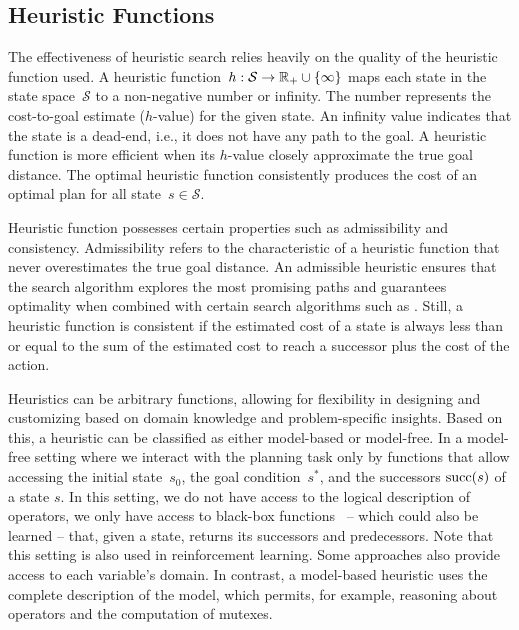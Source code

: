\subsection{Heuristic Functions}
\label{sec:background_heuristicfunctions}

The effectiveness of heuristic search relies heavily on the quality of the heuristic function used. A heuristic function~$h:\mathcal{S}\rightarrow\mathbb{R}_{+}\cup\{\infty\}$ maps each state in the state space~$\mathcal{S}$ to a non-negative number or infinity. The number represents the cost-to-goal estimate ($h$-value) for the given state. An infinity value indicates that the state is a dead-end, i.e., it does not have any path to the goal. A heuristic function is more efficient when its $h$-value closely approximate the true goal distance. The optimal heuristic function \hstar consistently produces the cost of an optimal plan for all state~$s \in \mathcal{S}$.

Heuristic function possesses certain properties such as admissibility and consistency. Admissibility refers to the characteristic of a heuristic function that never overestimates the true goal distance. An admissible heuristic ensures that the search algorithm explores the most promising paths and guarantees optimality when combined with certain search algorithms such as \astar. Still, a heuristic function is consistent if the estimated cost of a state is always less than or equal to the sum of the estimated cost to reach a successor plus the cost of the action.

Heuristics can be arbitrary functions, allowing for flexibility in designing and customizing based on domain knowledge and problem-specific insights. Based on this, a heuristic can be classified as either model-based or model-free. In a model-free setting where we interact with the planning task only by functions that allow accessing the initial state~$s_0$, the goal condition~$s^*$, and the successors $\operatorname{succ}(s)$ of a state $s$. In this setting, we do not have access to the logical description of operators, we only have access to black-box functions~\cite{Sturtevant2019} -- which could also be learned -- that, given a state, returns its successors and predecessors. Note that this setting is also used in reinforcement learning. Some approaches also provide access to each variable's domain. In contrast, a model-based heuristic uses the complete description of the model, which permits, for example, reasoning about operators and the computation of mutexes.

